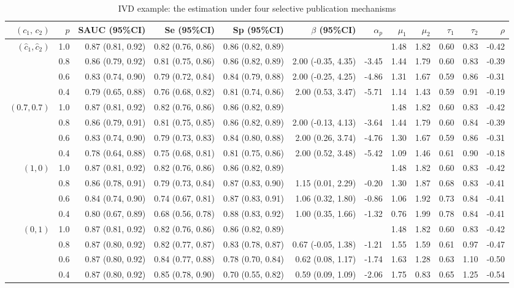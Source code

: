 \begin{table}

\caption{IVD example: the estimation under four selective publication mechanisms}
\centering
\begin{tabular}[t]{rrrrrrrrrrrr}
\toprule
$(c_1, \,c_2)$ & $p$ & SAUC (95\%CI) & Se (95\%CI) & Sp (95\%CI) & $\beta$ (95\%CI) & $\alpha_p$ & $\mu_1$ & $\mu_2$ & $\tau_1$ & $\tau_2$ & $\rho$\\
\midrule
$(\hat{c}_1, \hat{c}_2)$ & 1.0 & 0.87 (0.81, 0.92) & 0.82 (0.76, 0.86) & 0.86 (0.82, 0.89) &  &  & 1.48 & 1.82 & 0.60 & 0.83 & -0.42\\
 & 0.8 & 0.86 (0.79, 0.92) & 0.81 (0.75, 0.86) & 0.86 (0.82, 0.89) & 2.00 (-0.35, 4.35) & -3.45 & 1.44 & 1.79 & 0.60 & 0.83 & -0.39\\
 & 0.6 & 0.83 (0.74, 0.90) & 0.79 (0.72, 0.84) & 0.84 (0.79, 0.88) & 2.00 (-0.25, 4.25) & -4.86 & 1.31 & 1.67 & 0.59 & 0.86 & -0.31\\
 & 0.4 & 0.79 (0.65, 0.88) & 0.76 (0.68, 0.82) & 0.81 (0.74, 0.86) & 2.00 (0.53, 3.47) & -5.71 & 1.14 & 1.43 & 0.59 & 0.91 & -0.19\\
\addlinespace
$(0.7, 0.7)$ & 1.0 & 0.87 (0.81, 0.92) & 0.82 (0.76, 0.86) & 0.86 (0.82, 0.89) &  &  & 1.48 & 1.82 & 0.60 & 0.83 & -0.42\\
 & 0.8 & 0.86 (0.79, 0.91) & 0.81 (0.75, 0.85) & 0.86 (0.82, 0.89) & 2.00 (-0.13, 4.13) & -3.64 & 1.44 & 1.79 & 0.60 & 0.84 & -0.39\\
 & 0.6 & 0.83 (0.74, 0.90) & 0.79 (0.73, 0.83) & 0.84 (0.80, 0.88) & 2.00 (0.26, 3.74) & -4.76 & 1.30 & 1.67 & 0.59 & 0.86 & -0.31\\
 & 0.4 & 0.78 (0.64, 0.88) & 0.75 (0.68, 0.81) & 0.81 (0.75, 0.86) & 2.00 (0.52, 3.48) & -5.42 & 1.09 & 1.46 & 0.61 & 0.90 & -0.18\\
\addlinespace
$(1, 0)$ & 1.0 & 0.87 (0.81, 0.92) & 0.82 (0.76, 0.86) & 0.86 (0.82, 0.89) &  &  & 1.48 & 1.82 & 0.60 & 0.83 & -0.42\\
 & 0.8 & 0.86 (0.78, 0.91) & 0.79 (0.73, 0.84) & 0.87 (0.83, 0.90) & 1.15 (0.01, 2.29) & -0.20 & 1.30 & 1.87 & 0.68 & 0.83 & -0.41\\
 & 0.6 & 0.84 (0.74, 0.90) & 0.74 (0.67, 0.81) & 0.87 (0.83, 0.91) & 1.06 (0.32, 1.80) & -0.86 & 1.06 & 1.92 & 0.73 & 0.84 & -0.41\\
 & 0.4 & 0.80 (0.67, 0.89) & 0.68 (0.56, 0.78) & 0.88 (0.83, 0.92) & 1.00 (0.35, 1.66) & -1.32 & 0.76 & 1.99 & 0.78 & 0.84 & -0.41\\
\addlinespace
$(0, 1)$ & 1.0 & 0.87 (0.81, 0.92) & 0.82 (0.76, 0.86) & 0.86 (0.82, 0.89) &  &  & 1.48 & 1.82 & 0.60 & 0.83 & -0.42\\
 & 0.8 & 0.87 (0.80, 0.92) & 0.82 (0.77, 0.87) & 0.83 (0.78, 0.87) & 0.67 (-0.05, 1.38) & -1.21 & 1.55 & 1.59 & 0.61 & 0.97 & -0.47\\
 & 0.6 & 0.87 (0.80, 0.92) & 0.84 (0.77, 0.88) & 0.78 (0.70, 0.84) & 0.62 (0.08, 1.17) & -1.74 & 1.63 & 1.28 & 0.63 & 1.10 & -0.50\\
 & 0.4 & 0.87 (0.80, 0.92) & 0.85 (0.78, 0.90) & 0.70 (0.55, 0.82) & 0.59 (0.09, 1.09) & -2.06 & 1.75 & 0.83 & 0.65 & 1.25 & -0.54\\
\bottomrule
\end{tabular}
\end{table}
